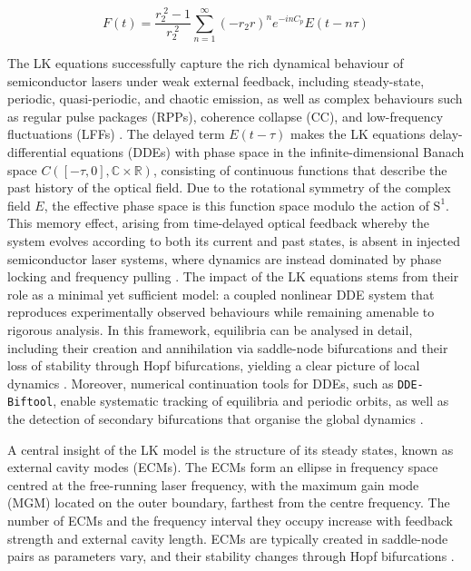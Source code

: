 %
\begin{equation}
\label{eq:multiple_EC}
    F(t) = \frac{r_2^{\;2} - 1}{r_2^{\;2}} \sum_{n=1}^\infty (-r_2 r)^n e^{-i n C_p} E(t-n \tau)
\end{equation}
%
\par
%
The LK equations successfully capture the rich dynamical behaviour of semiconductor lasers under weak external feedback, including steady-state, periodic, quasi-periodic, and chaotic emission, as well as complex behaviours such as regular pulse packages (RPPs), coherence collapse (CC), and low-frequency fluctuations (LFFs) \cite{heil1998coexistence}.
The delayed term $E(t-\tau)$ makes the LK equations delay-differential equations (DDEs) with phase space in the infinite-dimensional Banach space $C([-\tau,0],\mathbb{C}\times\mathbb{R})$, consisting of continuous functions that describe the past history of the optical field.
Due to the rotational symmetry of the complex field $E$, the effective phase space is this function space modulo the action of $\mathrm{S}^1$.
This memory effect, arising from time-delayed optical feedback whereby the system evolves according to both its current and past states, is absent in injected semiconductor laser systems, where dynamics are instead dominated by phase locking and frequency pulling \cite{krauskopf1998semiconductor}.
The impact of the LK equations stems from their role as a minimal yet sufficient model: a coupled nonlinear DDE system that reproduces experimentally observed behaviours while remaining amenable to rigorous analysis.
In this framework, equilibria can be analysed in detail, including their creation and annihilation via saddle-node bifurcations and their loss of stability through Hopf bifurcations, yielding a clear picture of local dynamics \cite{rottschafer2007ecm}.
Moreover, numerical continuation tools for DDEs, such as \texttt{DDE-Biftool}, enable systematic tracking of equilibria and periodic orbits, as well as the detection of secondary bifurcations that organise the global dynamics \cite{sieber2014dde, krauskopf2004dynamics}.
%
\par
%
A central insight of the LK model is the structure of its steady states, known as external cavity modes (ECMs).
The ECMs form an ellipse in frequency space centred at the free-running laser frequency, with the maximum gain mode (MGM) located on the outer boundary, farthest from the centre frequency.
The number of ECMs and the frequency interval they occupy increase with feedback strength and external cavity length. 
ECMs are typically created in saddle-node pairs as parameters vary, and their stability changes through Hopf bifurcations \cite{heil2003delay, rottschafer2007ecm}.

